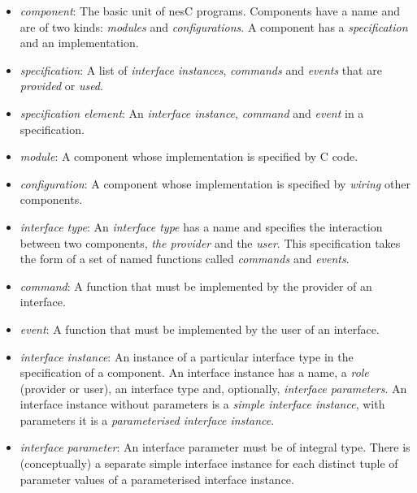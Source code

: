 \documentclass[11pt]{article}
\newcommand{\nesc}{nesC\xspace}
\begin{document}
\begin{itemize}

\item \emph{component}: The basic unit of \nesc programs. Components have a
name and are of two kinds: \emph{modules} and \emph{configurations}. A
component has a \emph{specification} and an implementation. 

\item \emph{specification}: A list of \emph{interface instances},
\emph{commands} and \emph{events} that are \emph{provided} or \emph{used}.

\item \emph{specification element}: An \emph{interface instance},
\emph{command} and \emph{event} in a specification.

\item \emph{module}: A component whose implementation is specified by C code. 

\item \emph{configuration}: A component whose implementation is specified
by \emph{wiring} other components.

\item \emph{interface type}: An \emph{interface type} has a name and
specifies the interaction between two components, \emph{the provider} and
the \emph{user}. This specification takes the form of a set of named
functions called \emph{commands} and \emph{events}.

\item \emph{command}: A function that must be implemented by the provider
of an interface.

\item \emph{event}: A function that must be implemented by the user of
an interface.


\item \emph{interface instance}: An instance of a particular interface type
in the specification of a component. An interface instance has a name, a
\emph{role} (provider or user), an interface type and, optionally,
\emph{interface parameters}. An interface instance without parameters is
a \emph{simple interface instance}, with parameters it is a
\emph{parameterised interface instance}.

\item \emph{interface parameter}: An interface parameter must be of
integral type. There is (conceptually) a separate simple interface instance
for each distinct tuple of parameter values of a parameterised interface
instance.


\end{itemize}
\end{document}
